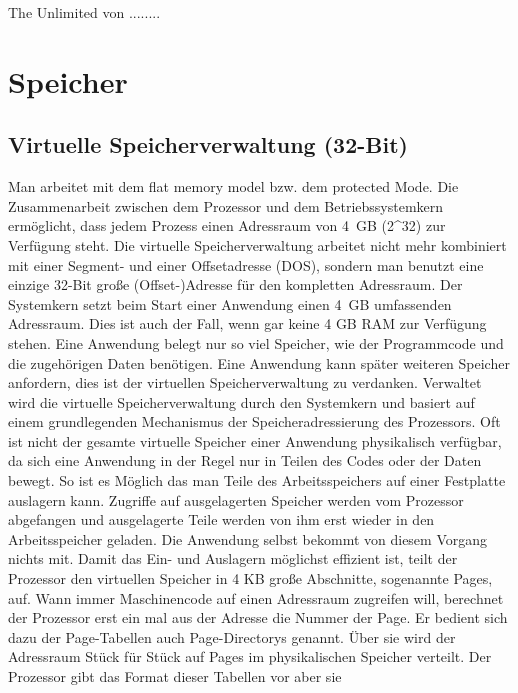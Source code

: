 ﻿\documentclass[12pt]{book}
\begin{document}
\begin{center}
	\Large
	The Unlimited
	\tiny
	von ........
\end{center}

\newpage

\tableofcontents
\newpage

\section{Speicher}

\subsection{Virtuelle Speicherverwaltung (32-Bit)}
Man arbeitet mit dem flat memory model bzw. dem protected Mode. Die
Zusammenarbeit zwischen dem Prozessor und dem Betriebssystemkern ermöglicht,
dass jedem Prozess einen Adressraum von 4 GB (2^32) zur Verfügung steht. Die
virtuelle Speicherverwaltung arbeitet nicht mehr kombiniert mit einer Segment-
und einer Offsetadresse (DOS), sondern man benutzt eine einzige 32-Bit große
(Offset-)Adresse für den kompletten Adressraum. Der Systemkern setzt beim Start
einer Anwendung einen 4 GB umfassenden Adressraum. Dies ist auch der Fall, wenn
gar keine 4 GB RAM zur Verfügung stehen. Eine Anwendung belegt nur so viel
Speicher, wie der Programmcode und die zugehörigen Daten benötigen. Eine
Anwendung kann später weiteren Speicher anfordern, dies ist der virtuellen
Speicherverwaltung zu verdanken. Verwaltet wird die virtuelle Speicherverwaltung
durch den Systemkern und basiert auf einem grundlegenden Mechanismus der
Speicheradressierung des Prozessors. Oft ist nicht der gesamte virtuelle
Speicher einer Anwendung physikalisch verfügbar, da sich eine Anwendung in der
Regel nur in Teilen des Codes oder der Daten bewegt. So ist es Möglich das man
Teile des Arbeitsspeichers auf einer Festplatte auslagern kann. Zugriffe auf
ausgelagerten Speicher werden vom Prozessor abgefangen und ausgelagerte Teile
werden von ihm erst wieder in den Arbeitsspeicher geladen. Die Anwendung selbst
bekommt von diesem Vorgang nichts mit. Damit das Ein- und Auslagern möglichst
effizient ist, teilt der Prozessor den virtuellen Speicher in 4 KB große
Abschnitte, sogenannte Pages, auf. Wann immer Maschinencode auf einen Adressraum
zugreifen will, berechnet der Prozessor erst ein mal aus der Adresse die Nummer
der Page. Er bedient sich dazu der Page-Tabellen auch Page-Directorys genannt.
Über sie wird der Adressraum Stück für Stück auf Pages im physikalischen
Speicher verteilt. Der Prozessor gibt das Format dieser Tabellen vor aber sie
\end{document}
